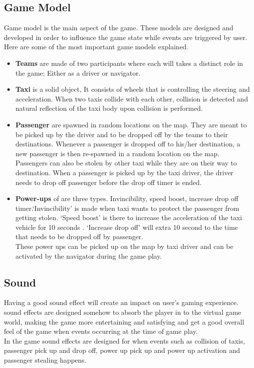\subsection*{Game Model}
	Game model is the main aspect of the game. These models are designed and developed in order to influence the game state while events are triggered by user. Here are some of the most important game models explained.

\begin{itemize}
	
	\item \textbf{Teams }are made of two participants where each will takes a distinct role in the game; Either as a driver or navigator.
	\item \textbf{Taxi} is a solid object, It consists of wheels that is controlling the steering and acceleration. When two taxis collide with each other, collision is detected and natural reflection of the taxi body upon collision is performed.  	
	\item \textbf{Passenger} are spawned in random locations on the map. They are meant to be picked up by the driver and to be dropped off by the teams to their destinations. Whenever a passenger is dropped off to his/her destination, a new passenger is then re-spawned in a random location on the map. Passengers can also be stolen by other taxi while they are on their way to destination. When a passenger is picked up by the taxi driver, the driver needs to drop off passenger before the drop off timer is ended.
			
	\item \textbf{Power-ups } of are three types. Invincibility, speed boost, increase drop off timer.`Invincibility' is made when taxi wants to protect the passenger from getting stolen. `Speed boost' is there to increase the acceleration of the taxi vehicle for 10 seconds . `Increase drop off' will extra 10 second to the time that needs to be dropped off by passenger.\\
	These power ups can be picked up on the map by taxi driver and can be activated by the navigator during the game play.   
\end{itemize}	

\subsection*{Sound}
	Having a good sound effect will create an impact on user's gaming experience. sound effects are designed somehow to absorb the player in to the virtual game world, making the game more entertaining and satisfying and get a good overall feel of the game when events occurring at the time of game play.\\
	In the game sound effects are designed for when events such as collision of taxis, passenger pick up and drop off, power up pick up and power up activation and passenger stealing happens.


